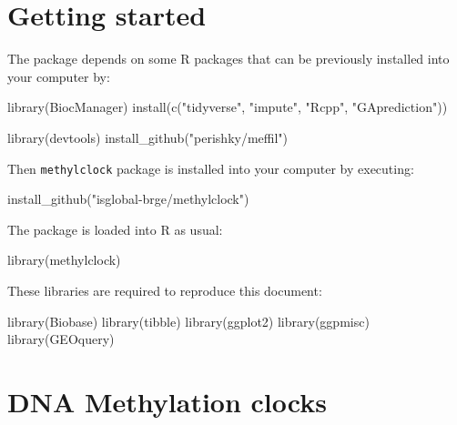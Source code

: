 \documentclass[]{article}
\newcommand{\hlstr}[1]{\textcolor[rgb]{0.251,0.627,0.251}{#1}}%
\newcommand{\hlstd}[1]{\textcolor[rgb]{0.251,0.251,0.251}{#1}}%
\newcommand{\hlkwd}[1]{\textcolor[rgb]{0.878,0.439,0.125}{#1}}%
\newenvironment{Shaded}{\begin{myshaded}}{\end{myshaded}}
\newcommand{\KeywordTok}[1]{\hlkwd{#1}}
\newcommand{\StringTok}[1]{\hlstr{#1}}
\newcommand{\NormalTok}[1]{\hlstd{#1}}
\begin{document}
\hypertarget{getting-started}{%
\section{Getting started}\label{getting-started}}

The package depends on some R packages that can be previously installed into your computer by:

\begin{Shaded}
\begin{Highlighting}[]
\KeywordTok{library}\NormalTok{(BiocManager)}
\KeywordTok{install}\NormalTok{(}\KeywordTok{c}\NormalTok{(}\StringTok{"tidyverse"}\NormalTok{, }\StringTok{"impute"}\NormalTok{, }\StringTok{"Rcpp"}\NormalTok{, }\StringTok{"GAprediction"}\NormalTok{))}

\KeywordTok{library}\NormalTok{(devtools)}
\KeywordTok{install_github}\NormalTok{(}\StringTok{"perishky/meffil"}\NormalTok{)}
\end{Highlighting}
\end{Shaded}

Then \texttt{methylclock} package is installed into your computer by executing:

\begin{Shaded}
\begin{Highlighting}[]
\KeywordTok{install_github}\NormalTok{(}\StringTok{"isglobal-brge/methylclock"}\NormalTok{)}
\end{Highlighting}
\end{Shaded}

The package is loaded into R as usual:

\begin{Shaded}
\begin{Highlighting}[]
\KeywordTok{library}\NormalTok{(methylclock)}
\end{Highlighting}
\end{Shaded}

These libraries are required to reproduce this document:

\begin{Shaded}
\begin{Highlighting}[]
\KeywordTok{library}\NormalTok{(Biobase)}
\KeywordTok{library}\NormalTok{(tibble)}
\KeywordTok{library}\NormalTok{(ggplot2)}
\KeywordTok{library}\NormalTok{(ggpmisc)}
\KeywordTok{library}\NormalTok{(GEOquery)}
\end{Highlighting}
\end{Shaded}

\hypertarget{dna-methylation-clocks}{%
\section{DNA Methylation clocks}\label{dna-methylation-clocks}}
\end{document}
